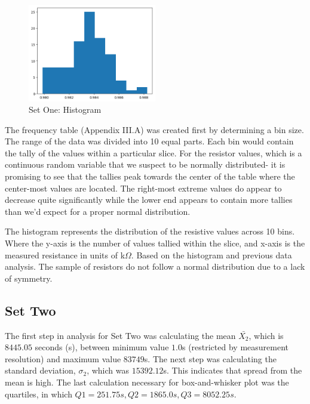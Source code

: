 \documentclass[10pt]{report}
\begin{document}
\begin{figure}
    \centering
    \includegraphics[width=0.50\textwidth]{results/resistor_histogram}
    \caption{Set One: Histogram}
\end{figure}



The frequency table (Appendix III.A) was created first by determining a bin size. The range of the data was
divided into 10 equal parts. Each bin would contain the tally of the values within
a particular slice. For the resistor values, which is a continuous random variable that we
suspect to be normally distributed- it is promising to see that the tallies peak towards the center of the table
where the center-most values are located. The right-most extreme values do appear to decrease quite significantly while
the lower end appears to contain more tallies than we'd expect for a proper normal distribution.

The histogram represents the distribution of the resistive values across 10 bins.
Where the y-axis is the number of values tallied within the slice, and x-axis is the measured
resistance in units of k$\Omega$.
Based on the histogram and previous data analysis. The sample of resistors do not follow a
normal distribution due to a lack of symmetry.



\subsection*{Set Two}

The first step in analysis for Set Two was calculating the mean $\bar{X_2}$, which is  $8445.05$ seconds (s),
between minimum value $1.0$s (restricted by measurement resolution) and maximum value $83749$s. The next step was calculating
the standard deviation, $\sigma_2$, which was $15392.12$s. This indicates that spread from the mean is high.
The last calculation necessary for box-and-whisker plot was the quartiles,
in which $Q1 = 251.75s, Q2 = 1865.0s, Q3 = 8052.25s$.
\end{document}

